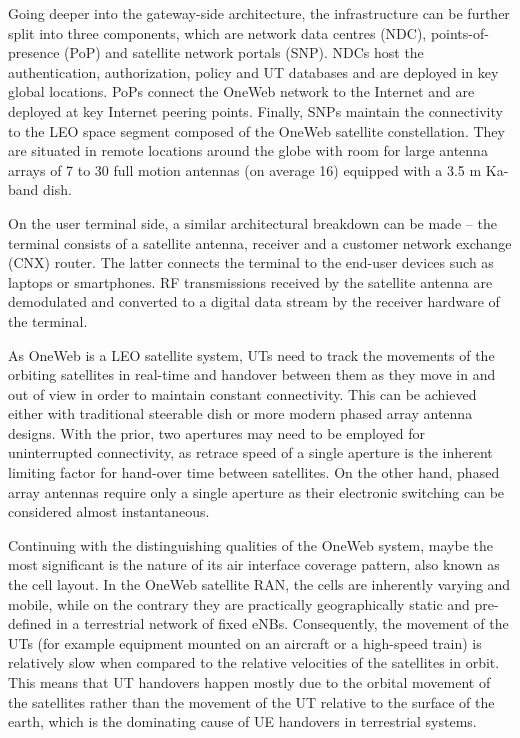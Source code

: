 \documentclass[english, 12pt, a4paper, elec, utf8, a-1b, online]{aaltothesis}
\begin{document}
Going deeper into the gateway-side architecture, the infrastructure can be further split into three components, which are network data centres (NDC), points-of-presence (PoP) and satellite network portals (SNP). NDCs host the authentication, authorization, policy and UT databases and are deployed in key global locations. PoPs connect the OneWeb network to the Internet and are deployed at key Internet peering points. Finally, SNPs maintain the connectivity to the LEO space segment composed of the OneWeb satellite constellation. They are situated in remote locations around the globe with room for large antenna arrays of 7 to 30 full motion antennas (on average 16) equipped with a 3.5 m Ka-band dish. \cite{henri2020oneweb}

On the user terminal side, a similar architectural breakdown can be made – the terminal consists of a satellite antenna, receiver and a customer network exchange (CNX) router. The latter connects the terminal to the end-user devices such as laptops or smartphones. 
\cite{henri2020oneweb} RF transmissions received by the satellite antenna are demodulated and converted to a digital data stream by the receiver hardware of the terminal.

As OneWeb is a LEO satellite system, UTs need to track the movements of the orbiting satellites in real-time and handover between them as they move in and out of view in order to maintain constant connectivity. This can be achieved either with traditional steerable dish or more modern phased array antenna designs. With the prior, two apertures may need to be employed for uninterrupted connectivity, as retrace speed of a single aperture is the inherent limiting factor for hand-over time between satellites. On the other hand, phased array antennas require only a single aperture as their electronic switching can be considered almost instantaneous. \cite{worldvu2016loi}

Continuing with the distinguishing qualities of the OneWeb system, maybe the most significant is the nature of its air interface coverage pattern, also known as the cell layout. In the OneWeb satellite RAN, the cells are inherently varying and mobile, while on the contrary they are practically geographically static and pre-defined in a terrestrial network of fixed eNBs. Consequently, the movement of the UTs (for example equipment mounted on an aircraft or a high-speed train) is relatively slow when compared to the relative velocities of the satellites in orbit. This means that UT handovers happen mostly due to the orbital movement of the satellites rather than the movement of the UT relative to the surface of the earth, which is the dominating cause of UE handovers in terrestrial systems. \cite{corson2019admission}
\end{document}
